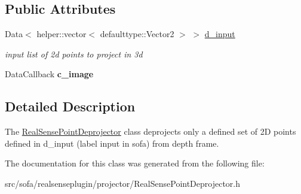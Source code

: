\subsection*{Public Attributes}
\begin{DoxyCompactItemize}
\item 
\mbox{\label{classsofa_1_1rgbdtracking_1_1_real_sense_point_deprojector_a93e870b27e925201cd94f0e3c353ba94}} 
Data$<$ helper\+::vector$<$ defaulttype\+::\+Vector2 $>$ $>$ \hyperlink{classsofa_1_1rgbdtracking_1_1_real_sense_point_deprojector_a93e870b27e925201cd94f0e3c353ba94}{d\+\_\+input}
\begin{DoxyCompactList}\small\item\em input list of 2d points to project in 3d \end{DoxyCompactList}\item 
\mbox{\label{classsofa_1_1rgbdtracking_1_1_real_sense_point_deprojector_a66a99e38b3bdc576ed7da5df8307aa89}} 
Data\+Callback {\bfseries c\+\_\+image}
\end{DoxyCompactItemize}


\subsection{Detailed Description}
The \hyperlink{classsofa_1_1rgbdtracking_1_1_real_sense_point_deprojector}{Real\+Sense\+Point\+Deprojector} class deprojects only a defined set of 2D points defined in d\+\_\+input (label input in sofa) from depth frame. 

The documentation for this class was generated from the following file\+:\begin{DoxyCompactItemize}
\item 
src/sofa/realsenseplugin/projector/Real\+Sense\+Point\+Deprojector.\+h\end{DoxyCompactItemize}
